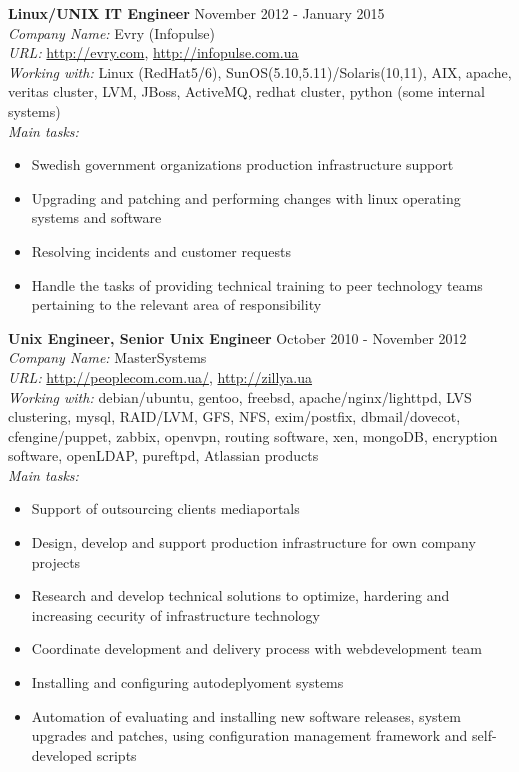 \documentclass[mymargin,10pt]{res} %
\begin{document}
\begin{resume}
{\bf Linux/UNIX IT Engineer} \hfill November 2012 - January 2015 \\
{\sl Company Name:} Evry (Infopulse) \\
{\sl URL:} \url{http://evry.com}, \url{http://infopulse.com.ua} \\
{\sl Working with:} Linux (RedHat5/6), SunOS(5.10,5.11)/Solaris(10,11), AIX, apache, veritas cluster, LVM,
JBoss, ActiveMQ, redhat cluster, python (some internal systems) \\
{\sl Main tasks:}
\begin{itemize}
\item Swedish government organizations production infrastructure support
\item Upgrading and patching and performing changes with linux operating systems and software
\item Resolving incidents and customer requests
\item Handle the tasks of providing technical training to peer technology teams pertaining to the
  relevant area of responsibility
\end{itemize}


{\bf Unix Engineer, Senior Unix Engineer} \hfill October 2010 - November 2012 \\
{\sl Company Name:} MasterSystems \\
{\sl URL:} \url{http://peoplecom.com.ua/}, \url{http://zillya.ua}\\
{\sl Working with:} debian/ubuntu, gentoo, freebsd, apache/nginx/lighttpd, LVS clustering, mysql,
RAID/LVM, GFS, NFS, exim/postfix, dbmail/dovecot, cfengine/puppet, zabbix, openvpn, routing software,
xen, mongoDB, encryption software, openLDAP, pureftpd, Atlassian products \\
{\sl Main tasks:}
\begin{itemize}
\item Support of outsourcing clients mediaportals
\item Design, develop and support production infrastructure for own company projects
\item Research and develop technical solutions to optimize, hardering and increasing cecurity of infrastructure technology
\item Coordinate development and delivery process with webdevelopment team
\item Installing and configuring autodeplyoment systems
\item Automation of evaluating and installing new software releases, system upgrades and patches,
  using configuration management framework and self-developed scripts
\end{itemize}


\end{resume}
\end{document}

